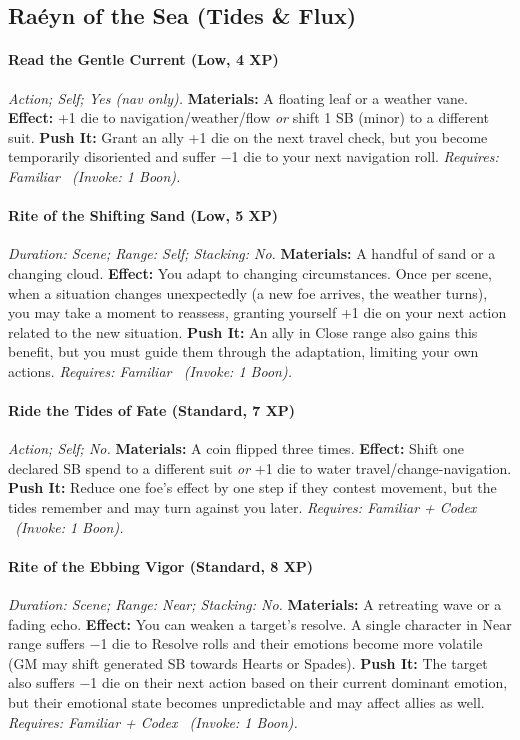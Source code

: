 \subsection{Raéyn of the Sea (Tides \& Flux)}
\paragraph{Read the Gentle Current (Low, 4 XP)} \emph{Action; Self; Yes (nav only).}
\textbf{Materials:} A floating leaf or a weather vane.
\textbf{Effect:} +1 die to navigation/weather/flow \emph{or} shift 1 SB (minor) to a different suit.
\textbf{Push It:} Grant an ally +1 die on the next travel check, but you become temporarily disoriented and suffer −1 die to your next navigation roll.
\emph{Requires: Familiar \ (\textit{Invoke:} 1 Boon).}
\paragraph{Rite of the Shifting Sand (Low, 5 XP)} \emph{Duration: Scene; Range: Self; Stacking: No.}
\textbf{Materials:} A handful of sand or a changing cloud.
\textbf{Effect:} You adapt to changing circumstances. Once per scene, when a situation changes unexpectedly (a new foe arrives, the weather turns), you may take a moment to reassess, granting yourself +1 die on your next action related to the new situation.
\textbf{Push It:} An ally in Close range also gains this benefit, but you must guide them through the adaptation, limiting your own actions.
\emph{Requires: Familiar \ (\textit{Invoke:} 1 Boon).}
\paragraph{Ride the Tides of Fate (Standard, 7 XP)} \emph{Action; Self; No.}
\textbf{Materials:} A coin flipped three times.
\textbf{Effect:} Shift one declared SB spend to a different suit \emph{or} +1 die to water travel/change-navigation.
\textbf{Push It:} Reduce one foe's effect by one step if they contest movement, but the tides remember and may turn against you later.
\emph{Requires: Familiar + Codex \ (\textit{Invoke:} 1 Boon).}
\paragraph{Rite of the Ebbing Vigor (Standard, 8 XP)} \emph{Duration: Scene; Range: Near; Stacking: No.}
\textbf{Materials:} A retreating wave or a fading echo.
\textbf{Effect:} You can weaken a target's resolve. A single character in Near range suffers −1 die to Resolve rolls and their emotions become more volatile (GM may shift generated SB towards Hearts or Spades).
\textbf{Push It:} The target also suffers −1 die on their next action based on their current dominant emotion, but their emotional state becomes unpredictable and may affect allies as well.
\emph{Requires: Familiar + Codex \ (\textit{Invoke:} 1 Boon).}
